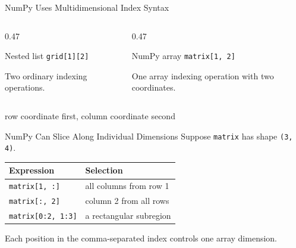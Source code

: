 \documentclass[aspectratio=169,10pt]{beamer}
\begin{document}
\begin{frame}{NumPy Uses Multidimensional Index Syntax}
  \begin{columns}[T,onlytextwidth]
    \begin{column}{0.47\textwidth}
      \begin{block}{Nested list}
        \centering
        \texttt{grid[1][2]}
      \end{block}
      Two ordinary indexing operations.
    \end{column}
    \begin{column}{0.47\textwidth}
      \begin{block}{NumPy array}
        \centering
        \texttt{matrix[1, 2]}
      \end{block}
      One array indexing operation with two coordinates.
    \end{column}
  \end{columns}

  \begin{center}
    row coordinate first, column coordinate second
  \end{center}
\end{frame}

\begin{frame}{NumPy Can Slice Along Individual Dimensions}
  Suppose \texttt{matrix} has shape \texttt{(3, 4)}.

  \begin{center}
    \renewcommand{\arraystretch}{1.35}
    \begin{tabular}{l|l}
      \textbf{Expression} & \textbf{Selection} \\\hline
      \texttt{matrix[1, :]} & all columns from row 1 \\
      \texttt{matrix[:, 2]} & column 2 from all rows \\
      \texttt{matrix[0:2, 1:3]} & a rectangular subregion
    \end{tabular}
  \end{center}

  \begin{keyidea}
    Each position in the comma-separated index controls one array dimension.
  \end{keyidea}
\end{frame}
\end{document}

